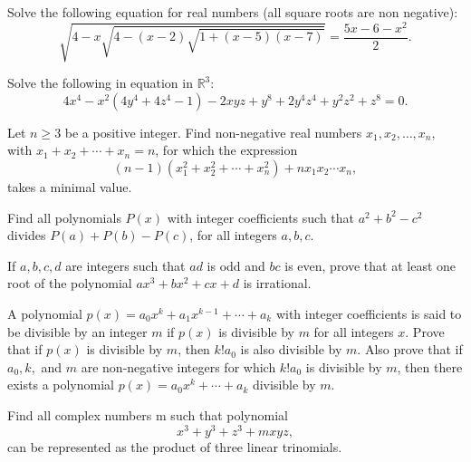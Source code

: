 \begin{question}[name={2004 Austria}]
    Solve the following equation for real numbers (all square roots are non negative):
    \[\sqrt{4-x\sqrt{4-(x-2)\sqrt{1+(x-5)(x-7)}}}=\frac{5x-6-x^2}{2}.\]
\end{question}


\begin{question}[name={2010 Austria}]
    Solve the following in equation in $\mathbb{R}^3$:
    \[4x^4-x^2(4y^4+4z^4-1)-2xyz+y^8+2y^4z^4+y^2z^2+z^8=0.\]
\end{question}


\begin{question}[name={2010 Donova (Danube)}]
    Let $n\ge3$ be a positive integer. Find non-negative real numbers $x_1,x_2,\dots,x_n$, with $x_1+x_2+\cdots +x_n=n$, for which the expression \[(n-1)(x_1^2+x_2^2+\cdots+x_n^2)+nx_1x_2\cdots x_n,\] takes a minimal value.
\end{question}


\begin{question}[name={2017 Donova (Danube)}]
    Find all polynomials $P(x)$ with integer coefficients such that $a^2+b^2-c^2$ divides $P(a)+P(b)-P(c)$, for all integers $a,b,c$.
\end{question}

\begin{question}[name={1959--1966 IMO Longlist}]
     If $a,b, c,d$ are integers such that $ad$ is odd and $bc$ is even, prove that at least one root of the polynomial $ax^3 +bx^2 +cx+d$ is irrational.
\end{question}

\begin{question}[name={1968 IMO Shortlist}]
    A polynomial $p(x) = a_0x^k +a_1x^{k-1} +\cdots+a_k$ with integer coefficients is said to be divisible by an integer $m$ if $p(x)$ is divisible by $m$ for all integers $x$. Prove that if $p(x)$ is divisible by $m$, then $k!a_0$ is also divisible by $m$. Also prove that if $a_0, k,$ and $m$ are non-negative integers for which $k!a_0$ is divisible by $m$, then there exists a polynomial $p(x) = a_0x^k +\cdots+a_k$ divisible by $m$.
\end{question}


\begin{question}[name={1968 IMO Shortlist}]
    Find all complex numbers m such that polynomial
    \[x^3 +y^3 +z^3 +mxyz,\]
    can be represented as the product of three linear trinomials.
\end{question}



